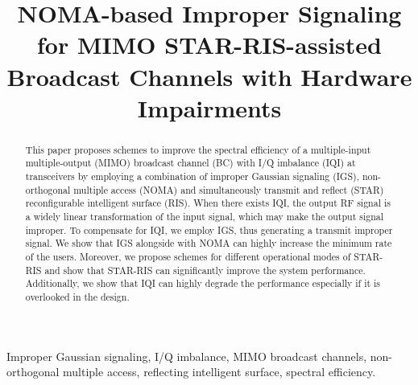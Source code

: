 \documentclass[a4, conference]{IEEEtran}
\theoremstyle{definition}
\begin{document}
\title{
NOMA-based Improper Signaling for MIMO STAR-RIS-assisted Broadcast Channels with Hardware Impairments
}
\author{%
}
\maketitle
\begin{abstract}
This paper proposes schemes to improve the spectral efficiency of a multiple-input multiple-output (MIMO) broadcast channel (BC) with I/Q imbalance (IQI) at transceivers by employing  a combination of improper Gaussian signaling (IGS), non-orthogonal multiple access (NOMA) and simultaneously transmit and reflect (STAR) reconfigurable intelligent surface (RIS). When there exists IQI, the output RF signal is a widely linear transformation of the input signal, which may make the output signal improper. To compensate for IQI, we employ IGS, thus generating a transmit improper signal. We show that IGS alongside with NOMA can highly increase the minimum rate of the users. Moreover, we propose schemes for different operational modes of STAR-RIS and show that STAR-RIS can significantly improve the system performance. Additionally, we show that IQI can highly degrade the performance especially if it is overlooked in the design.
\end{abstract} 
\begin{IEEEkeywords}
 Improper Gaussian signaling, I/Q imbalance, MIMO broadcast channels, non-orthogonal multiple access, reflecting intelligent surface, spectral efficiency.
\end{IEEEkeywords}
\end{document}
